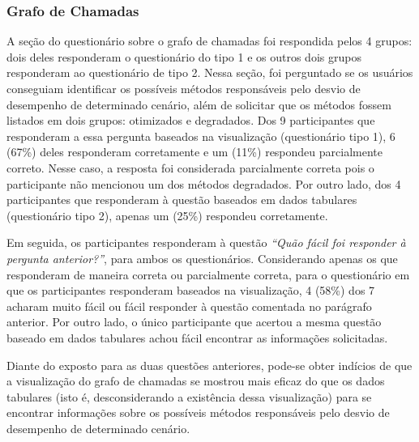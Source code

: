 \subsubsection{Grafo de Chamadas}

A seção do questionário sobre o grafo de chamadas foi respondida pelos 4 grupos: dois deles responderam o questionário do tipo 1 e os outros dois grupos responderam ao questionário de tipo 2. Nessa seção, foi perguntado se os usuários conseguiam identificar os possíveis métodos responsáveis pelo desvio de desempenho de determinado cenário, além de solicitar que os métodos fossem listados em dois grupos: otimizados e degradados. Dos 9 participantes que responderam a essa pergunta baseados na visualização (questionário tipo 1), 6 (67\%) deles responderam corretamente e um (11\%) respondeu parcialmente correto. Nesse caso, a resposta foi considerada parcialmente correta pois o participante não mencionou um dos métodos degradados. Por outro lado, dos 4 participantes que responderam à questão baseados em dados tabulares (questionário tipo 2), apenas um (25\%) respondeu corretamente. %

Em seguida, os participantes responderam à questão \textit{``Quão fácil foi responder à pergunta anterior?''}, para ambos os questionários. Considerando apenas os que responderam de maneira correta ou parcialmente correta, para o questionário em que os participantes responderam baseados na visualização, 4 (58\%) dos 7 acharam muito fácil ou fácil responder à questão comentada no parágrafo anterior. Por outro lado, o único participante que acertou a mesma questão baseado em dados tabulares achou fácil encontrar as informações solicitadas.

\begin{framed}
  \noindent Diante do exposto para as duas questões anteriores, pode-se obter indícios de que a visualização do grafo de chamadas se mostrou mais eficaz do que os dados tabulares (isto é, desconsiderando a existência dessa visualização) para se encontrar informações sobre os possíveis métodos responsáveis pelo desvio de desempenho de determinado cenário.
\end{framed}

